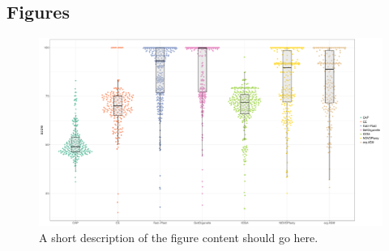 \documentclass{bmcart}
\begin{document}
\begin{backmatter}




\section*{Figures}
  \begin{figure}[h!]
  \includegraphics[width=\textwidth]{plots/swarm.pdf}
  \caption{
      A short description of the figure content
      should go here.}
      \label{fig:swarmplot}
      \end{figure}


\end{backmatter}
\end{document}
